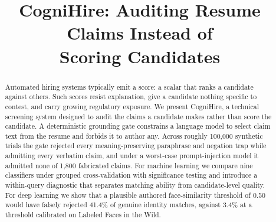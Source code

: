 \documentclass[conference,a4paper]{IEEEtran}
\begin{document}
\title{CogniHire: Auditing Resume Claims Instead of\\Scoring Candidates}

\author{
\and
{}
\and
{}
}

\maketitle

\begin{abstract}
Automated hiring systems typically emit a score: a scalar that ranks a
candidate against others. Such scores resist explanation, give a candidate
nothing specific to contest, and carry growing regulatory exposure. We present CogniHire, a technical
screening system designed to audit the claims a candidate makes rather than
score the candidate. A deterministic grounding gate constrains a language model to select
claim text from the resume and forbids it to author any. Across roughly
100,000 synthetic trials the gate rejected every meaning-preserving paraphrase
and negation trap while admitting every verbatim claim, and under a worst-case
prompt-injection model it admitted none of 1,800 fabricated claims. For machine
learning we compare nine classifiers under grouped cross-validation with
significance testing and introduce a within-query diagnostic that separates
matching ability from candidate-level quality. For deep learning we show that a
plausible authored face-similarity threshold of 0.50 would have falsely rejected
41.4\% of genuine identity matches, against 3.4\% at a threshold calibrated on
Labeled Faces in the Wild.
\end{abstract}
\end{document}
